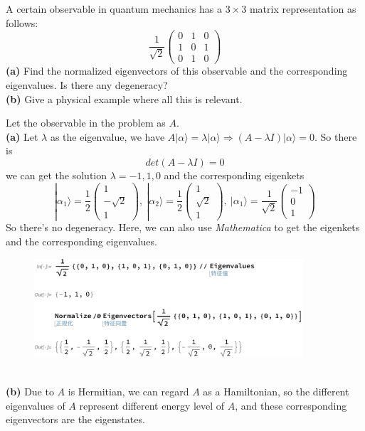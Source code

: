 \documentclass[UTF8,12pt]{article} %
\makeatletter
\newenvironment{proof}[1][\protect\proofname]{\par
\normalfont\topsep6\p@\@plus6\p@\relax
\trivlist
\itemindent\parindent
\item[\hskip\labelsep
\scshape
#1]\ignorespaces
}{%
\endtrivlist\@endpefalse
}
\renewcommand{\proofname}{\it{Solution}}
\makeatother
\begin{document}
\begin{exercise}{1.14}{}
A certain observable in quantum mechanics has a $3\times 3$ matrix representation as follows:
$$\frac{1}{\sqrt{2}} \begin{pmatrix} 0 & 1 & 0 \\ 1 & 0 & 1 \\ 0 & 1 & 0 \end{pmatrix}$$
\textbf{(a)} Find the normalized eigenvectors of this observable and the corresponding eigenvalues. Is there any degeneracy?\\
\textbf{(b)} Give a physical example where all this is relevant.
\end{exercise}

\begin{proof}
Let the observable in the problem as $A$.\\
\textbf{(a)} Let  $\lambda$ as the eigenvalue, we have $A|\alpha \rangle = \lambda |\alpha \rangle \Rightarrow (A - \lambda I)|\alpha \rangle = 0$. So there is
$$det(A - \lambda I) = 0$$
we can get the solution $\lambda = -1, 1, 0$ and the corresponding eigenkets
$$|\alpha_1\rangle = \frac{1}{2}\begin{pmatrix} 1 \\ -\sqrt{2} \\ 1 \end{pmatrix},~ |\alpha_2\rangle = \frac{1}{2}\begin{pmatrix} 1 \\ \sqrt{2} \\ 1 \end{pmatrix},~ |\alpha_1\rangle = \frac{1}{\sqrt{2}}\begin{pmatrix} -1 \\ 0 \\ 1 \end{pmatrix}$$
So there's no degeneracy.
Here, we can also use \textit{Mathematica} to get the eigenkets and the corresponding eigenvalues.
\begin{figure}[htbp]
\centering
\includegraphics[width=10cm]{eigen}
\end{figure}\\
\textbf{(b)} Due to $A$ is Hermitian, we can regard $A$ as a Hamiltonian, so the different eigenvalues of $A$ represent different energy level of $A$, and these corresponding eigenvectors are the eigenstates. 
\end{proof}
\end{document}
